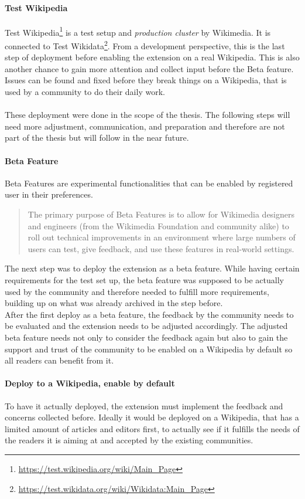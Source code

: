 \paragraph{Test Wikipedia}
Test Wikipedia\footnote{\url{https://test.wikipedia.org/wiki/Main_Page}} is a test setup and \textit{production cluster} by Wikimedia. It is connected to Test Wikidata\footnote{\url{https://test.wikidata.org/wiki/Wikidata:Main_Page}}. From a development perspective, this is the last step of deployment before enabling the extension on a real Wikipedia. This is also another chance to gain more attention and collect input before the Beta feature. Issues can be found and fixed before they break things on a Wikipedia, that is used by a community to do their daily work. \\
\\
These deployment were done in the scope of the thesis. The following steps will need more adjustment, communication, and preparation and therefore are not part of the thesis but will follow in the near future. 

\paragraph{Beta Feature}
Beta Features are experimental functionalities that can be enabled by registered user in their preferences. 
\begin{quotation}
	The primary purpose of Beta Features is to allow for Wikimedia designers and engineers (from the Wikimedia Foundation and community alike) to roll out technical improvements in an environment where large numbers of users can test, give feedback, and use these features in real-world settings.
\end{quotation} \citep{wiki:04}

The next step was to deploy the extension as a beta feature. While having certain requirements for the test set up, the beta feature was supposed to be actually used by the community and therefore needed to fulfill more requirements, building up on what was already archived in the step before. \\
After the first deploy as a beta feature, the feedback by the community needs to be evaluated and the extension needs to be adjusted accordingly. The adjusted beta feature needs not only to consider the feedback again but also to gain the support and trust of the community to be enabled on a Wikipedia by default so all readers can benefit from it.

\paragraph{Deploy to a Wikipedia, enable by default}
To have it actually deployed, the extension must implement the feedback and concerns collected before. Ideally it would be deployed on a Wikipedia, that has a limited amount of articles and editors first, to actually see if it fulfills the needs of the readers it is aiming at and accepted by the existing communities. 

